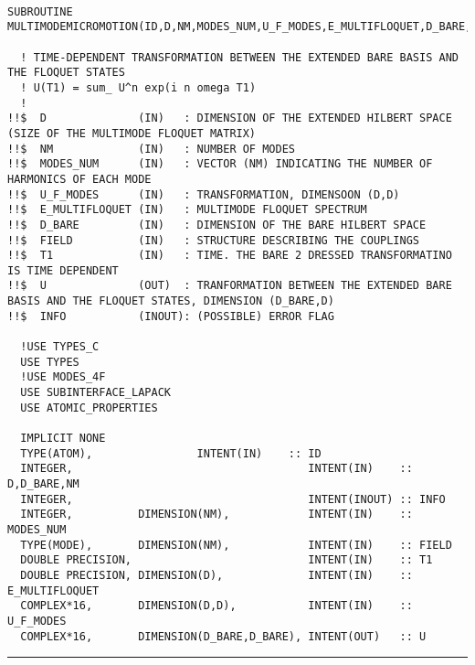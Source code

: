\documentclass[10pt,a4paper]{article}
\begin{document}
\begin{verbatim}

SUBROUTINE MULTIMODEMICROMOTION(ID,D,NM,MODES_NUM,U_F_MODES,E_MULTIFLOQUET,D_BARE,FIELD,T1,U,INFO) 

  ! TIME-DEPENDENT TRANSFORMATION BETWEEN THE EXTENDED BARE BASIS AND THE FLOQUET STATES
  ! U(T1) = sum_ U^n exp(i n omega T1)
  ! 
!!$  D              (IN)   : DIMENSION OF THE EXTENDED HILBERT SPACE (SIZE OF THE MULTIMODE FLOQUET MATRIX)
!!$  NM             (IN)   : NUMBER OF MODES            
!!$  MODES_NUM      (IN)   : VECTOR (NM) INDICATING THE NUMBER OF HARMONICS OF EACH MODE
!!$  U_F_MODES      (IN)   : TRANSFORMATION, DIMENSOON (D,D) 
!!$  E_MULTIFLOQUET (IN)   : MULTIMODE FLOQUET SPECTRUM
!!$  D_BARE         (IN)   : DIMENSION OF THE BARE HILBERT SPACE
!!$  FIELD          (IN)   : STRUCTURE DESCRIBING THE COUPLINGS
!!$  T1             (IN)   : TIME. THE BARE 2 DRESSED TRANSFORMATINO IS TIME DEPENDENT
!!$  U              (OUT)  : TRANFORMATION BETWEEN THE EXTENDED BARE BASIS AND THE FLOQUET STATES, DIMENSION (D_BARE,D)
!!$  INFO           (INOUT): (POSSIBLE) ERROR FLAG
 
  !USE TYPES_C
  USE TYPES
  !USE MODES_4F
  USE SUBINTERFACE_LAPACK
  USE ATOMIC_PROPERTIES

  IMPLICIT NONE
  TYPE(ATOM),                INTENT(IN)    :: ID
  INTEGER,                                    INTENT(IN)    :: D,D_BARE,NM 
  INTEGER,                                    INTENT(INOUT) :: INFO
  INTEGER,          DIMENSION(NM),            INTENT(IN)    :: MODES_NUM
  TYPE(MODE),       DIMENSION(NM),            INTENT(IN)    :: FIELD  
  DOUBLE PRECISION,                           INTENT(IN)    :: T1 
  DOUBLE PRECISION, DIMENSION(D),             INTENT(IN)    :: E_MULTIFLOQUET 
  COMPLEX*16,       DIMENSION(D,D),           INTENT(IN)    :: U_F_MODES 
  COMPLEX*16,       DIMENSION(D_BARE,D_BARE), INTENT(OUT)   :: U 

\end{verbatim}
\begin{center}
\rule{12cm}{1pt}
\end{center}
\end{document}
